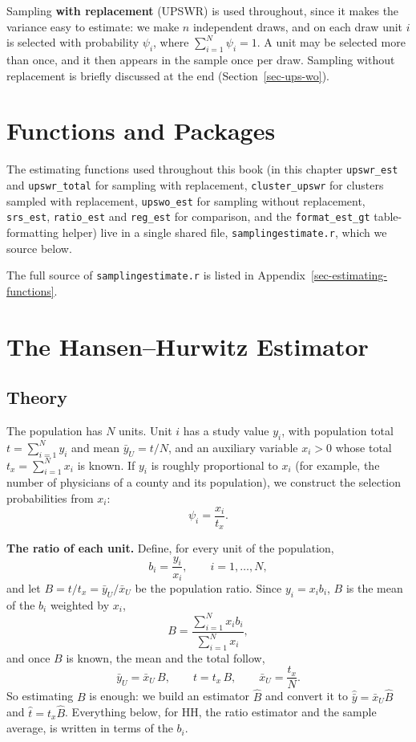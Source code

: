 \documentclass[
  letterpaper,
  DIV=11,
  numbers=noendperiod]{scrreprt}
\renewcommand{\[}{\begin{equation}}
\renewcommand{\]}{\end{equation}}
\begin{document}
Sampling \textbf{with replacement} (UPSWR) is used throughout, since it
makes the variance easy to estimate: we make \(n\) independent draws,
and on each draw unit \(i\) is selected with probability \(\psi_i\),
where \(\sum_{i=1}^N\psi_i=1\). A unit may be selected more than once,
and it then appears in the sample once per draw. Sampling without
replacement is briefly discussed at the end (Section~\ref{sec-ups-wo}).

\section{Functions and Packages}\label{functions-and-packages}

The estimating functions used throughout this book (in this chapter
\texttt{upswr\_est} and \texttt{upswr\_total} for sampling with
replacement, \texttt{cluster\_upswr} for clusters sampled with
replacement, \texttt{upswo\_est} for sampling without replacement,
\texttt{srs\_est}, \texttt{ratio\_est} and \texttt{reg\_est} for
comparison, and the \texttt{format\_est\_gt} table-formatting helper)
live in a single shared file, \texttt{samplingestimate.r}, which we
source below.

The full source of \texttt{samplingestimate.r} is listed in
Appendix~\ref{sec-estimating-functions}.

\section{The Hansen--Hurwitz Estimator}\label{sec-ups-hh}

\subsection{Theory}\label{sec-ups-hh-theory}

The population has \(N\) units. Unit \(i\) has a study value \(y_i\),
with population total \(t=\sum_{i=1}^N y_i\) and mean \(\bar{y}_U=t/N\),
and an auxiliary variable \(x_i>0\) whose total \(t_x=\sum_{i=1}^N x_i\)
is known. If \(y_i\) is roughly proportional to \(x_i\) (for example,
the number of physicians of a county and its population), we construct
the selection probabilities from \(x_i\): \[
\psi_i=\frac{x_i}{t_x}.
\]

\textbf{The ratio of each unit.} Define, for every unit of the
population, \[
b_i=\frac{y_i}{x_i},\qquad i=1,\ldots,N,
\] and let \(B=t/t_x=\bar{y}_U/\bar{x}_U\) be the population ratio.
Since \(y_i=x_ib_i\), \(B\) is the mean of the \(b_i\) weighted by
\(x_i\), \[
B=\frac{\sum_{i=1}^N x_ib_i}{\sum_{i=1}^N x_i},
\] and once \(B\) is known, the mean and the total follow, \[
\bar{y}_U=\bar{x}_U\,B,\qquad t=t_x\,B,\qquad \bar{x}_U=\frac{t_x}{N}.
\] So estimating \(B\) is enough: we build an estimator \(\hat{B}\) and
convert it to \(\hat{\bar{y}}=\bar{x}_U\hat{B}\) and
\(\hat{t}=t_x\hat{B}\). Everything below, for HH, the ratio estimator
and the sample average, is written in terms of the \(b_i\).
\end{document}
